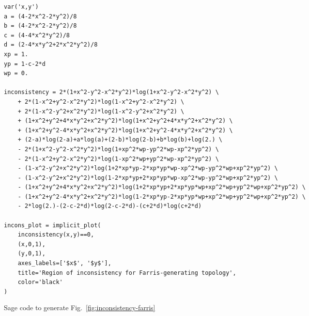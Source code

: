 \begin{table}
    \begin{center}
\begin{verbatim}
var('x,y')
a = (4-2*x^2-2*y^2)/8
b = (4-2*x^2-2*y^2)/8
c = (4-4*x^2*y^2)/8
d = (2-4*x*y^2+2*x^2*y^2)/8
xp = 1.
yp = 1-c-2*d
wp = 0.

inconsistency = 2*(1+x^2-y^2-x^2*y^2)*log(1+x^2-y^2-x^2*y^2) \
    + 2*(1-x^2+y^2-x^2*y^2)*log(1-x^2+y^2-x^2*y^2) \
    + 2*(1-x^2-y^2+x^2*y^2)*log(1-x^2-y^2+x^2*y^2) \
    + (1+x^2+y^2+4*x*y^2+x^2*y^2)*log(1+x^2+y^2+4*x*y^2+x^2*y^2) \
    + (1+x^2+y^2-4*x*y^2+x^2*y^2)*log(1+x^2+y^2-4*x*y^2+x^2*y^2) \
    + (2-a)*log(2-a)+a*log(a)+(2-b)*log(2-b)+b*log(b)+log(2.) \
    - 2*(1+x^2-y^2-x^2*y^2)*log(1+xp^2*wp-yp^2*wp-xp^2*yp^2) \
    - 2*(1-x^2+y^2-x^2*y^2)*log(1-xp^2*wp+yp^2*wp-xp^2*yp^2) \
    - (1-x^2-y^2+x^2*y^2)*log(1+2*xp*yp-2*xp*yp*wp-xp^2*wp-yp^2*wp+xp^2*yp^2) \
    - (1-x^2-y^2+x^2*y^2)*log(1-2*xp*yp+2*xp*yp*wp-xp^2*wp-yp^2*wp+xp^2*yp^2) \
    - (1+x^2+y^2+4*x*y^2+x^2*y^2)*log(1+2*xp*yp+2*xp*yp*wp+xp^2*wp+yp^2*wp+xp^2*yp^2) \
    - (1+x^2+y^2-4*x*y^2+x^2*y^2)*log(1-2*xp*yp-2*xp*yp*wp+xp^2*wp+yp^2*wp+xp^2*yp^2) \
    - 2*log(2.)-(2-c-2*d)*log(2-c-2*d)-(c+2*d)*log(c+2*d)

incons_plot = implicit_plot(
    inconsistency(x,y)==0,
    (x,0,1),
    (y,0,1),
    axes_labels=['$x$', '$y$'],
    title='Region of inconsistency for Farris-generating topology',
    color='black'
)
\end{verbatim}
    \end{center}
\caption{Sage code to generate Fig.~\ref{fig:inconsistency-farris}}
\label{list:sage}
\end{table}





